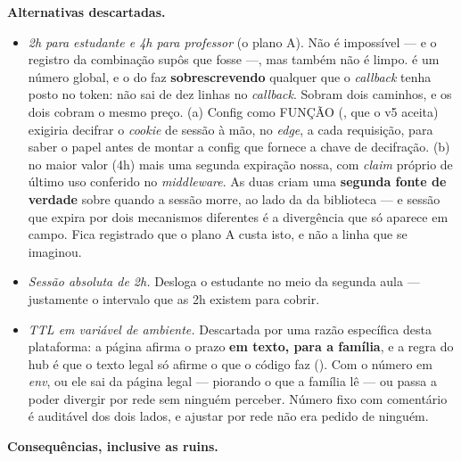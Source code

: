 \textbf{Alternativas descartadas.}
\begin{itemize}
  \item \emph{2h para estudante e 4h para professor} (o plano A). Não é
    impossível --- e o registro da combinação supôs que fosse ---, mas também
    não é limpo.  é um número global, e o  do
     faz 
    \textbf{sobrescrevendo} qualquer  que o \emph{callback} 
    tenha posto no token: não sai de dez linhas no \emph{callback}. Sobram dois
    caminhos, e os dois cobram o mesmo preço. (a) Config como FUNÇÃO
    (, que o v5 aceita) exigiria decifrar o
    \emph{cookie} de sessão à mão, no \emph{edge}, a cada requisição, para saber
    o papel antes de montar a config que fornece a chave de decifração. (b)
     no maior valor (4h) mais uma segunda expiração nossa, com
    \emph{claim} próprio de último uso conferido no \emph{middleware}. As duas
    criam uma \textbf{segunda fonte de verdade} sobre quando a sessão morre, ao
    lado da da biblioteca --- e sessão que expira por dois mecanismos diferentes
    é a divergência que só aparece em campo. Fica registrado que o plano A custa
    isto, e não a linha que se imaginou.
  \item \emph{Sessão absoluta de 2h.} Desloga o estudante no meio da segunda
    aula --- justamente o intervalo que as 2h existem para cobrir.
  \item \emph{TTL em variável de ambiente.} Descartada por uma razão específica
    desta plataforma: a página  afirma o prazo \textbf{em
    texto, para a família}, e a regra do hub é que o texto legal só afirme o que
    o código faz (). Com o número em \emph{env}, ou ele sai da
    página legal --- piorando o que a família lê --- ou passa a poder divergir
    por rede sem ninguém perceber. Número fixo com comentário é auditável dos
    dois lados, e ajustar por rede não era pedido de ninguém.
\end{itemize}

\textbf{Consequências, inclusive as ruins.}

